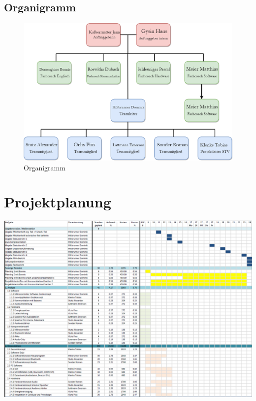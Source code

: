 \documentclass[10pt,a4paper,oneside]{99_fhnwreport}
\begin{document}
\begin{landscape}
\subsection{Organigramm}\label{subsec:organigramm}


\begin{figure}[htbp]
	\centering
	\includegraphics[scale=0.40]{pro4E_Struktur.png}
	\caption{Organigramm}
\end{figure}

\section{Projektplanung}\label{sec:projektplanung}

\includegraphics[height=\dimexpr\textheight-4\baselineskip\relax,page=1]{projektplan_1.pdf}
\newpage


\end{landscape}
\end{document}
